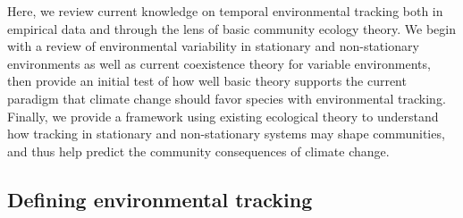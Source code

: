 \documentclass[11pt,letterpaper]{article}
\begin{document}
Here, we review current knowledge on temporal environmental tracking both in empirical data and through the lens of basic community ecology theory. We begin with a review of environmental variability in stationary and non-stationary environments as well as current coexistence theory for variable environments, then provide an initial test of how well basic theory supports the current paradigm that climate change should favor species with environmental tracking. Finally, we provide a framework using existing ecological theory to understand how tracking in stationary and non-stationary systems may shape communities, and thus help predict the community consequences of climate change. 

\subsection{Defining environmental tracking}
\end{document}
